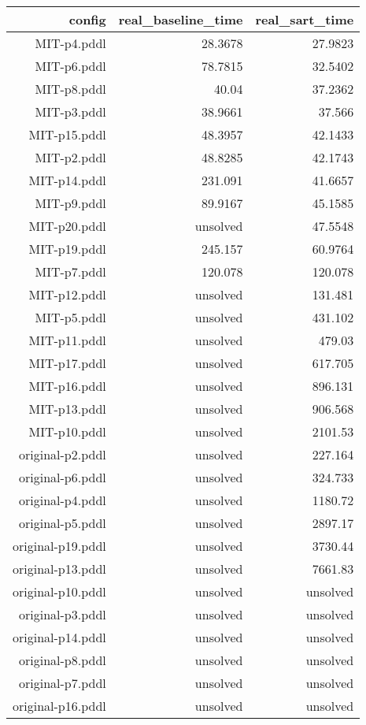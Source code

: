 \documentclass{article}
\begin{document}
                            \begin{center}
                            \scriptsize
                            \begin{tabular}{r|r|r}
                            config & real\_baseline\_time & real\_sart\_time\\\midrule
                             MIT-p4.pddl&28.3678&27.9823\\
 MIT-p6.pddl&78.7815&32.5402\\
 MIT-p8.pddl&40.04&37.2362\\
 MIT-p3.pddl&38.9661&37.566\\
 MIT-p15.pddl&48.3957&42.1433\\
 MIT-p2.pddl&48.8285&42.1743\\
 MIT-p14.pddl&231.091&41.6657\\
 MIT-p9.pddl&89.9167&45.1585\\
 MIT-p20.pddl&unsolved&47.5548\\
 MIT-p19.pddl&245.157&60.9764\\
 MIT-p7.pddl&120.078&120.078\\
 MIT-p12.pddl&unsolved&131.481\\
 MIT-p5.pddl&unsolved&431.102\\
 MIT-p11.pddl&unsolved&479.03\\
 MIT-p17.pddl&unsolved&617.705\\
 MIT-p16.pddl&unsolved&896.131\\
 MIT-p13.pddl&unsolved&906.568\\
 MIT-p10.pddl&unsolved&2101.53\\
 original-p2.pddl&unsolved&227.164\\
 original-p6.pddl&unsolved&324.733\\
 original-p4.pddl&unsolved&1180.72\\
 original-p5.pddl&unsolved&2897.17\\
 original-p19.pddl&unsolved&3730.44\\
 original-p13.pddl&unsolved&7661.83\\
 original-p10.pddl&unsolved&unsolved\\
 original-p3.pddl&unsolved&unsolved\\
 original-p14.pddl&unsolved&unsolved\\
 original-p8.pddl&unsolved&unsolved\\
 original-p7.pddl&unsolved&unsolved\\
 original-p16.pddl&unsolved&unsolved
                            \end{tabular}
                            \end{center}
                    
\end{document}
